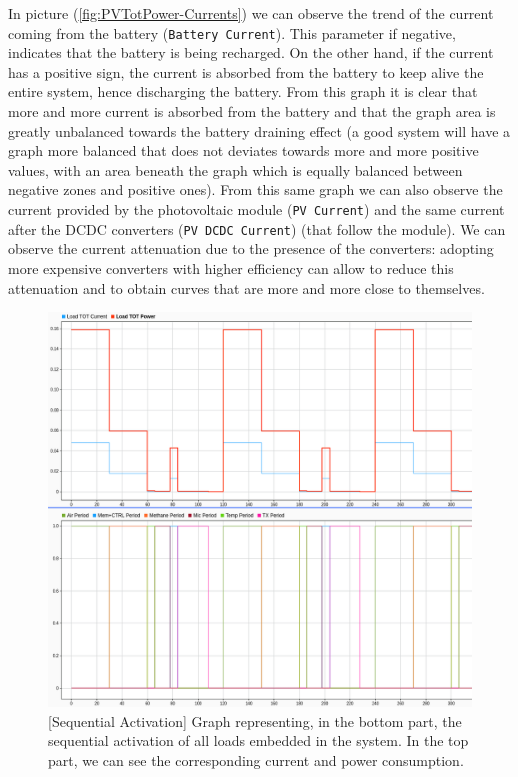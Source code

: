 \documentclass[a4paper]{article}
\begin{document}
        In picture (\ref{fig:PVTotPower-Currents}) we can observe the trend of the current coming from the battery (\texttt{Battery Current}). This parameter if negative, indicates that the battery is being recharged. On the other hand, if the current has a positive sign, the current is absorbed from the battery to keep alive the entire system, hence discharging the battery. From this graph it is clear that more and more current is absorbed from the battery and that the graph area is greatly unbalanced towards the battery draining effect (a good system will have a graph more balanced that does not deviates towards more and more positive values, with an area beneath the graph which is equally balanced between negative zones and positive ones). From this same graph we can also observe the current provided by the photovoltaic module (\texttt{PV Current}) and the same current after the DCDC converters (\texttt{PV DCDC Current}) (that follow the module). We can observe the current attenuation due to the presence of the converters: adopting more expensive converters with higher efficiency can allow to reduce this attenuation and to obtain curves that are more and more close to themselves.

        \begin{figure}[htp]
            \centering
            \includegraphics[width=1 \columnwidth]{./screenshots/SeqActiv/2Minutes/SeqLoadAndTOTPowerCurrent.png}
            \caption{
                    \label{fig:SeqLoadAndTOTPowerCurrent}
                    [Sequential Activation] Graph representing, in the bottom part, the sequential activation of all loads embedded in the system. In the top part, we can see the corresponding current and power consumption.
            }
        \end{figure}
\end{document}
